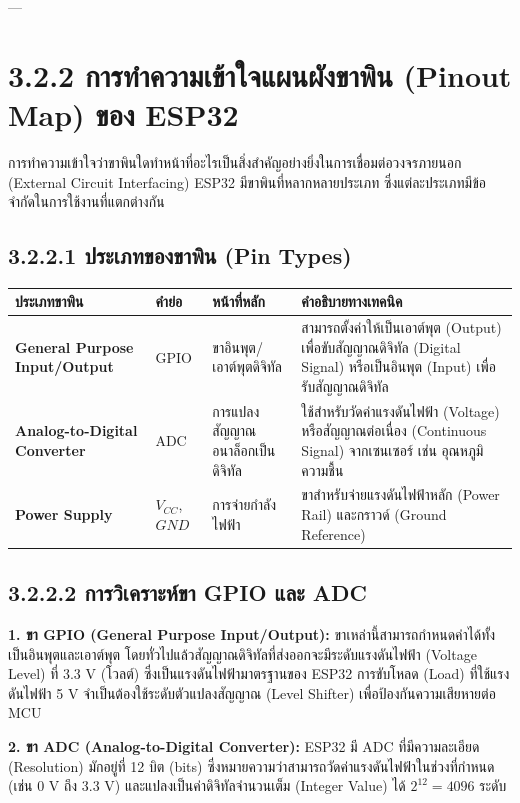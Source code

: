 \documentclass[11pt,a4paper,openany]{report}
\begin{document}
---

\section{3.2.2 การทำความเข้าใจแผนผังขาพิน (Pinout Map) ของ ESP32}


การทำความเข้าใจว่าขาพินใดทำหน้าที่อะไรเป็นสิ่งสำคัญอย่างยิ่งในการเชื่อมต่อวงจรภายนอก (External Circuit Interfacing) ESP32 มีขาพินที่หลากหลายประเภท ซึ่งแต่ละประเภทมีข้อจำกัดในการใช้งานที่แตกต่างกัน

\subsection{3.2.2.1 ประเภทของขาพิน (Pin Types)}


\begin{table}[htbp]
\centering
\begin{tabularx}{\textwidth}{L L L L}
\toprule
ประเภทขาพิน & คำย่อ & หน้าที่หลัก & คำอธิบายทางเทคนิค \\
\midrule
\textbf{General Purpose Input/Output} & GPIO & ขาอินพุต/เอาต์พุตดิจิทัล & สามารถตั้งค่าให้เป็นเอาต์พุต (Output) เพื่อขับสัญญาณดิจิทัล (Digital Signal) หรือเป็นอินพุต (Input) เพื่อรับสัญญาณดิจิทัล \\
\textbf{Analog-to-Digital Converter} & ADC & การแปลงสัญญาณอนาล็อกเป็นดิจิทัล & ใช้สำหรับวัดค่าแรงดันไฟฟ้า (Voltage) หรือสัญญาณต่อเนื่อง (Continuous Signal) จากเซนเซอร์ เช่น อุณหภูมิ ความชื้น \\
\textbf{Power Supply} & $V_{CC}$, $GND$ & การจ่ายกำลังไฟฟ้า & ขาสำหรับจ่ายแรงดันไฟฟ้าหลัก (Power Rail) และกราวด์ (Ground Reference) \\
\bottomrule
\end{tabularx}
\end{table}


\subsection{3.2.2.2 การวิเคราะห์ขา GPIO และ ADC}


\textbf{1. ขา GPIO (General Purpose Input/Output):}
ขาเหล่านี้สามารถกำหนดค่าได้ทั้งเป็นอินพุตและเอาต์พุต โดยทั่วไปแล้วสัญญาณดิจิทัลที่ส่งออกจะมีระดับแรงดันไฟฟ้า (Voltage Level) ที่ 3.3 V (โวลต์) ซึ่งเป็นแรงดันไฟฟ้ามาตรฐานของ ESP32 การขับโหลด (Load) ที่ใช้แรงดันไฟฟ้า 5 V จำเป็นต้องใช้ระดับตัวแปลงสัญญาณ (Level Shifter) เพื่อป้องกันความเสียหายต่อ MCU

\textbf{2. ขา ADC (Analog-to-Digital Converter):}
ESP32 มี ADC ที่มีความละเอียด (Resolution) มักอยู่ที่ 12 บิต (bits) ซึ่งหมายความว่าสามารถวัดค่าแรงดันไฟฟ้าในช่วงที่กำหนด (เช่น 0 V ถึง 3.3 V) และแปลงเป็นค่าดิจิทัลจำนวนเต็ม (Integer Value) ได้ $2^{12} = 4096$ ระดับ
\end{document}
